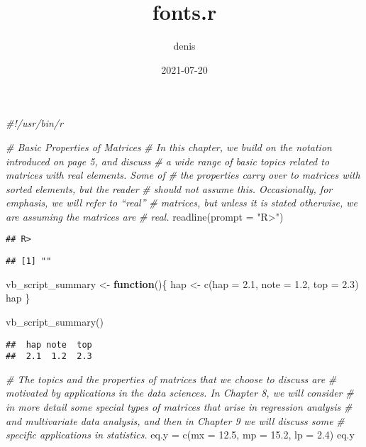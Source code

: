 \documentclass[
]{article}
\title{fonts.r}
\author{denis}
\date{2021-07-20}
\newenvironment{Shaded}{\begin{snugshade}}{\end{snugshade}}
\newcommand{\AttributeTok}[1]{\textcolor[rgb]{0.77,0.63,0.00}{#1}}
\newcommand{\CommentTok}[1]{\textcolor[rgb]{0.56,0.35,0.01}{\textit{#1}}}
\newcommand{\ControlFlowTok}[1]{\textcolor[rgb]{0.13,0.29,0.53}{\textbf{#1}}}
\newcommand{\FloatTok}[1]{\textcolor[rgb]{0.00,0.00,0.81}{#1}}
\newcommand{\FunctionTok}[1]{\textcolor[rgb]{0.00,0.00,0.00}{#1}}
\newcommand{\NormalTok}[1]{#1}
\newcommand{\OtherTok}[1]{\textcolor[rgb]{0.56,0.35,0.01}{#1}}
\newcommand{\StringTok}[1]{\textcolor[rgb]{0.31,0.60,0.02}{#1}}
\begin{document}
\maketitle

\begin{Shaded}
\begin{Highlighting}[]
\CommentTok{\#!/usr/bin/r}

\CommentTok{\# Basic Properties of Matrices}
\CommentTok{\# In this chapter, we build on the notation introduced on page 5, and discuss}
\CommentTok{\# a wide range of basic topics related to matrices with real elements. Some of}
\CommentTok{\# the properties carry over to matrices with sorted elements, but the reader}
\CommentTok{\# should not assume this. Occasionally, for emphasis, we will refer to “real”}
\CommentTok{\# matrices, but unless it is stated otherwise, we are assuming the matrices are}
\CommentTok{\# real.}
\FunctionTok{readline}\NormalTok{(}\AttributeTok{prompt =} \StringTok{"R\textgreater{}"}\NormalTok{)}
\end{Highlighting}
\end{Shaded}

\begin{verbatim}
## R>
\end{verbatim}

\begin{verbatim}
## [1] ""
\end{verbatim}

\begin{Shaded}
\begin{Highlighting}[]
\NormalTok{vb\_script\_summary }\OtherTok{\textless{}{-}} \ControlFlowTok{function}\NormalTok{()\{}
\NormalTok{  hap }\OtherTok{\textless{}{-}} \FunctionTok{c}\NormalTok{(}\AttributeTok{hap =} \FloatTok{2.1}\NormalTok{, }\AttributeTok{note =} \FloatTok{1.2}\NormalTok{, }\AttributeTok{top =} \FloatTok{2.3}\NormalTok{)}
\NormalTok{  hap}
\NormalTok{\}}


\FunctionTok{vb\_script\_summary}\NormalTok{()}
\end{Highlighting}
\end{Shaded}

\begin{verbatim}
##  hap note  top 
##  2.1  1.2  2.3
\end{verbatim}

\begin{Shaded}
\begin{Highlighting}[]
\CommentTok{\# The topics and the properties of matrices that we choose to discuss are}
\CommentTok{\# motivated by applications in the data sciences. In Chapter 8, we will consider}
\CommentTok{\# in more detail some special types of matrices that arise in regression analysis}
\CommentTok{\# and multivariate data analysis, and then in Chapter 9 we will discuss some}
\CommentTok{\# speciﬁc applications in statistics.}
\NormalTok{eq.y }\OtherTok{=} \FunctionTok{c}\NormalTok{(}\AttributeTok{mx =} \FloatTok{12.5}\NormalTok{, }\AttributeTok{mp =} \FloatTok{15.2}\NormalTok{, }\AttributeTok{lp =} \FloatTok{2.4}\NormalTok{)}
\NormalTok{eq.y}
\end{Highlighting}
\end{Shaded}
\end{document}
